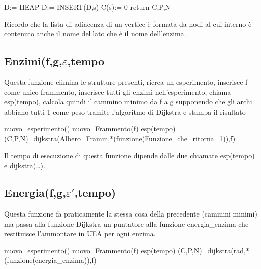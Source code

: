 \documentclass[a4paper,10pt]{article}
\begin{document}
\begin{algorithm}[H]
D:= HEAP\;
D:= INSERT(D,s)\;
C(s):= 0\;
return C,P,N\;
\end{algorithm}
Ricordo che la lista di adiacenza di un vertice è formata da nodi al cui interno è contenuto anche il nome del lato che è il nome dell'enzima.
\subsection{Enzimi(f,g,$\varepsilon$,tempo}
Questa funzione elimina le strutture presenti, ricrea un esperimento, inserisce f come unico frammento, inserisce tutti gli enzimi nell'esperimento, chiama esp(tempo), calcola quindi il cammino minimo da f a g supponendo che gli archi abbiano tutti 1 come peso tramite l'algoritmo di Dijkstra e stampa il risultato

\begin{algorithm}[H]
nuovo\_{}esperimento()\;
nuovo\_{}Frammento(f)\;
esp(tempo)\;
(C,P,N)=dijkstra(Albero\_{}Framm,*(funzione(Funzione\_{}che\_{}ritorna\_{}1)),f)\;
\end{algorithm}
Il tempo di esecuzione di questa funzione dipende dalle due chiamate esp(tempo) e dijkstra(\dots{}). 
\subsection{Energia(f,g,$\varepsilon '$,tempo)}
Questa funzione fa praticamente la stessa cosa della precedente (cammini minimi) ma passa alla funzione Dijkstra un puntatore alla funzione energia\_{}enzima che restituisce l'ammontare in UEA per ogni enzima.

\begin{algorithm}[H]
nuovo\_{}esperimento()\;
nuovo\_{}Frammento(f)\;
esp(tempo)\;
(C,P,N)=dijkstra(rad,*(funzione(energia\_{}enzima)),f)\;
\end{algorithm}
\end{document}
